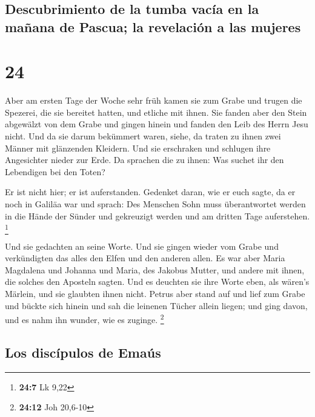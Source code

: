\hypertarget{descubrimiento-de-la-tumba-vacuxeda-en-la-mauxf1ana-de-pascua-la-revelaciuxf3n-a-las-mujeres}{%
\subsection{Descubrimiento de la tumba vacía en la mañana de Pascua; la
revelación a las
mujeres}\label{descubrimiento-de-la-tumba-vacuxeda-en-la-mauxf1ana-de-pascua-la-revelaciuxf3n-a-las-mujeres}}

\hypertarget{section-23}{%
\section{24}\label{section-23}}

 Aber am ersten Tage der Woche sehr früh kamen sie zum
Grabe und trugen die Spezerei, die sie bereitet hatten, und etliche mit
ihnen.  Sie fanden aber den Stein abgewälzt von dem Grabe
 und gingen hinein und fanden den Leib des Herrn Jesu
nicht.  Und da sie darum bekümmert waren, siehe, da traten
zu ihnen zwei Männer mit glänzenden Kleidern.  Und sie
erschraken und schlugen ihre Angesichter nieder zur Erde. Da sprachen
die zu ihnen: Was suchet ihr den Lebendigen bei den Toten?

 Er ist nicht hier; er ist auferstanden. Gedenket daran,
wie er euch sagte, da er noch in Galiläa war  und sprach:
Des Menschen Sohn muss überantwortet werden in die Hände der Sünder und
gekreuzigt werden und am dritten Tage auferstehen. \footnote{\textbf{24:7}
  Lk 9,22}

 Und sie gedachten an seine Worte.  Und sie
gingen wieder vom Grabe und verkündigten das alles den Elfen und den
anderen allen.  Es war aber Maria Magdalena und Johanna
und Maria, des Jakobus Mutter, und andere mit ihnen, die solches den
Aposteln sagten.  Und es deuchten sie ihre Worte eben,
als wären's Märlein, und sie glaubten ihnen nicht. 
Petrus aber stand auf und lief zum Grabe und bückte sich hinein und sah
die leinenen Tücher allein liegen; und ging davon, und es nahm ihn
wunder, wie es zuginge. \footnote{\textbf{24:12} Joh 20,6-10}

\hypertarget{los-discuxedpulos-de-emauxfas}{%
\subsection{Los discípulos de
Emaús}\label{los-discuxedpulos-de-emauxfas}}

